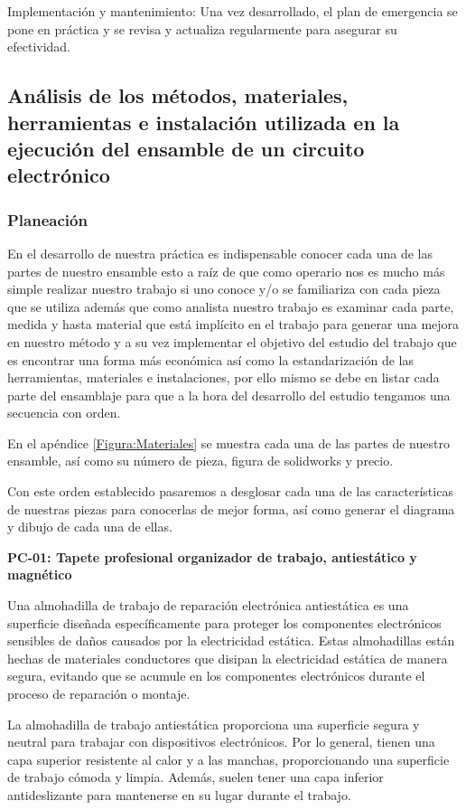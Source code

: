     Implementación y mantenimiento: Una vez desarrollado, el plan de emergencia se pone en práctica y se revisa y actualiza regularmente para asegurar su efectividad.
    \subsection{Análisis de los métodos, materiales, herramientas e instalación utilizada en la ejecución del ensamble de un circuito electrónico}
    
    \subsubsection{Planeación}
    
    En el desarrollo de nuestra práctica es indispensable conocer cada una de las partes de nuestro ensamble esto a raíz de que como operario nos es mucho más simple realizar nuestro trabajo si uno conoce y/o se familiariza con cada pieza que se utiliza además que como analista nuestro trabajo es examinar cada parte, medida y hasta material que está implícito en el trabajo para generar una mejora en nuestro método y a su vez implementar el objetivo del estudio del trabajo que es encontrar una forma más económica así como la estandarización de las herramientas, materiales e instalaciones, por ello mismo se debe en listar cada parte del ensamblaje para que a la hora del desarrollo del estudio tengamos una secuencia con orden.
    
    En el apéndice \ref{Figura:Materiales} se muestra cada una de las partes de nuestro ensamble, así como su número de pieza, figura de solidworks y precio.
    
    Con este orden establecido pasaremos a desglosar cada una de las características de nuestras piezas para conocerlas de mejor forma, así como generar  el diagrama y dibujo de cada una de ellas.
    
    \textbf{PC-01: Tapete profesional organizador de trabajo, antiestático y magnético}
    
    Una almohadilla de trabajo de reparación electrónica antiestática es una superficie diseñada específicamente para proteger los componentes electrónicos sensibles de daños causados por la electricidad estática. Estas almohadillas están hechas de materiales conductores que disipan la electricidad estática de manera segura, evitando que se acumule en los componentes electrónicos durante el proceso de reparación o montaje.
    
    La almohadilla de trabajo antiestática proporciona una superficie segura y neutral para trabajar con dispositivos electrónicos. Por lo general, tienen una capa superior resistente al calor y a las manchas, proporcionando una superficie de trabajo cómoda y limpia. Además, suelen tener una capa inferior antideslizante para mantenerse en su lugar durante el trabajo.
    
